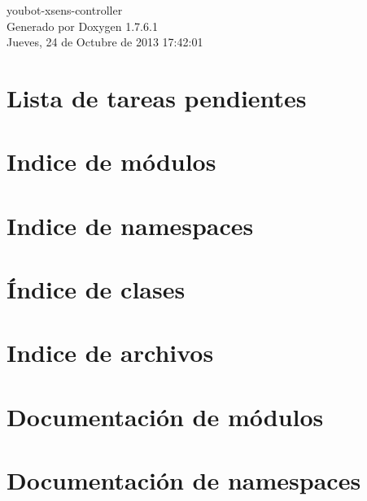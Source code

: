 \documentclass[a4paper]{book}
\begin{document}
\hypersetup{pageanchor=false,citecolor=blue}
\begin{titlepage}
\vspace*{7cm}
\begin{center}
{\Large youbot-\/xsens-\/controller }\\
\vspace*{1cm}
{\large \-Generado por Doxygen 1.7.6.1}\\
\vspace*{0.5cm}
{\small Jueves, 24 de Octubre de 2013 17:42:01}\\
\end{center}
\end{titlepage}
\clearemptydoublepage
{}
\tableofcontents
\clearemptydoublepage
{}
\hypersetup{pageanchor=true,citecolor=blue}
\chapter{\-Lista de tareas pendientes}
\label{todo}
\hypertarget{todo}{}

\chapter{\-Indice de módulos}

\chapter{\-Indice de namespaces}

\chapter{Índice de clases}

\chapter{\-Indice de archivos}

\chapter{\-Documentación de módulos}

\chapter{\-Documentación de namespaces}


\end{document}
